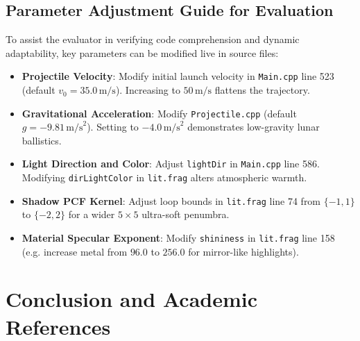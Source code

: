\documentclass[11pt,a4paper]{article}
\begin{document}
\subsection{Parameter Adjustment Guide for Evaluation}
To assist the evaluator in verifying code comprehension and dynamic adaptability, key parameters can be modified live in source files:
\begin{itemize}[itemsep=2pt,topsep=2pt]
  \item \textbf{Projectile Velocity}: Modify initial launch velocity in \texttt{Main.cpp} line 523 (default $v_0 = 35.0\,\text{m/s}$). Increasing to $50\,\text{m/s}$ flattens the trajectory.
  \item \textbf{Gravitational Acceleration}: Modify \texttt{Projectile.cpp} (default $g = -9.81\,\text{m/s}^2$). Setting to $-4.0\,\text{m/s}^2$ demonstrates low-gravity lunar ballistics.
  \item \textbf{Light Direction and Color}: Adjust \texttt{lightDir} in \texttt{Main.cpp} line 586. Modifying \texttt{dirLightColor} in \texttt{lit.frag} alters atmospheric warmth.
  \item \textbf{Shadow PCF Kernel}: Adjust loop bounds in \texttt{lit.frag} line 74 from $\{-1, 1\}$ to $\{-2, 2\}$ for a wider $5 \times 5$ ultra-soft penumbra.
  \item \textbf{Material Specular Exponent}: Modify \texttt{shininess} in \texttt{lit.frag} line 158 (e.g. increase metal from $96.0$ to $256.0$ for mirror-like highlights).
\end{itemize}

\section{Conclusion and Academic References}
\end{document}
